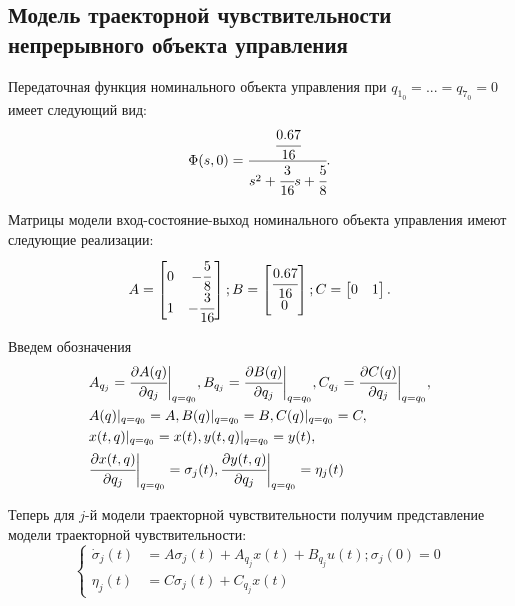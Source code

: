 \subsection{Модель траекторной чувствительности непрерывного объекта управления}

Передаточная функция номинального объекта управления при $ q_{1_{0}}=...=q_{7_{0}}=0 $ имеет следующий вид:
\begin{equation}
	\Phi(s, 0) = \cfrac{\cfrac{0.67}{16}}{s^2 + \cfrac{3}{16} s + \cfrac{5}{8}}. 
\end{equation}

Матрицы модели вход-состояние-выход номинального объекта управления имеют следующие реализации:
\begin{align*}
A =
\begin{bmatrix}
0 & -\cfrac{5} {8}\\
1 & - \cfrac{3}{16}
\end{bmatrix};
B =
\begin{bmatrix}
\cfrac{0.67}{16}\\
0
\end{bmatrix};
C =
\begin{bmatrix}
0 & 1
\end{bmatrix}.
\end{align*}

Введем обозначения
\begin{align*}
	&A_{q_j} = \cfrac{\partial{A(q)}}{\partial{q_j}} \bigg|_{q=q_0},
	B_{q_j} = \cfrac{\partial{B(q)}}{\partial{q_j}} \bigg|_{q=q_0},
	C_{q_j} = \cfrac{\partial{C(q)}}{\partial{q_j}} \bigg|_{q=q_0},\\
	&A(q)|_{q=q_0} = A,
	B(q)|_{q=q_0} = B,
	C(q)|_{q=q_0} = C,\\
	&x(t,q)|_{q=q_0} = x(t),
	y(t,q)|_{q=q_0} = y(t),\\
	&\cfrac{\partial{x(t,q)}}{\partial{q_j}} \bigg|_{q=q_0} = \sigma_j(t),
	\cfrac{\partial{y(t,q)}}{\partial{q_j}} \bigg|_{q=q_0} = \eta_j(t)
\end{align*}

Теперь для $j$-й модели траекторной чувствительности получим представление модели траекторной чувствительности:
\begin{equation}\label{eq_mts}
	\begin{cases}
		\dot \sigma_j(t) &= A \sigma_j(t) + A_{q_j} x(t) + B_{q_j} u(t); 
		\sigma_j (0) = 0\\
		\eta_j (t) &= C \sigma_j (t) + C_{q_j} x(t)
	\end{cases}
\end{equation}

